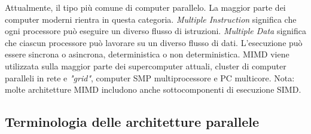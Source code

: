Attualmente, il tipo più comune di computer parallelo. La maggior parte dei computer moderni rientra in questa categoria. \textit{Multiple Instruction} significa che ogni processore può eseguire un diverso flusso di istruzioni. \textit{Multiple Data} significa che ciascun processore può lavorare su un diverso flusso di dati. L'esecuzione può essere sincrona o asincrona, deterministica o non deterministica. MIMD viene utilizzata sulla maggior parte dei supercomputer attuali, cluster di computer paralleli in rete e \textit{"grid"}, computer SMP multiprocessore e PC multicore. Nota: molte architetture MIMD includono anche sottocomponenti di esecuzione SIMD.

\subsection{Terminologia delle architetture parallele}
